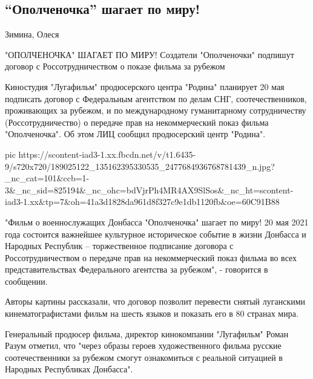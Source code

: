  
 
 
 
 
\subsection{\enquote{Ополченочка} шагает по миру!}

Зимина, Олеся

"ОПОЛЧЕНОЧКА" ШАГАЕТ ПО МИРУ! Создатели "Ополченочки" подпишут договор с Россотрудничеством о показе фильма за рубежом

Киностудия "Лугафильм" продюсерского центра "Родина" планирует 20 мая подписать
договор с Федеральным агентством по делам СНГ, соотечественников, проживающих
за рубежом, и по международному гуманитарному сотрудничеству
(Россотрудничество) о передаче прав на некоммерческий показ фильма
"Ополченочка". Об этом ЛИЦ сообщил продюсерский центр "Родина".

\ifcmt
  pic https://scontent-iad3-1.xx.fbcdn.net/v/t1.6435-9/s720x720/189025122_135162395330535_2477684936768781439_n.jpg?_nc_cat=101&ccb=1-3&_nc_sid=825194&_nc_ohc=bdVjrPh4MR4AX9SlSos&_nc_ht=scontent-iad3-1.xx&tp=7&oh=41a3d1828da961d8f327c9e1db1120fb&oe=60C91B88
\fi

"Фильм о военнослужащих Донбасса "Ополченочка" шагает по миру! 20 мая 2021 года
состоится важнейшее культурное историческое событие в жизни Донбасса и Народных
Республик – торжественное подписание договора с Россотрудничеством о передаче
прав на некоммерческий показ фильма во всех представительствах Федерального
агентства за рубежом", - говорится в сообщении.

Авторы картины рассказали, что договор позволит перевести снятый луганскими
кинематографистами фильм на шесть языков и показать его в 80 странах мира.

Генеральный продюсер фильма, директор кинокомпании "Лугафильм" Роман Разум
отметил, что "через образы героев художественного фильма русские
соотечественники за рубежом смогут ознакомиться с реальной ситуацией в Народных
Республиках Донбасса".

